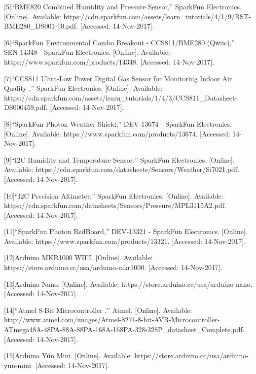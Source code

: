 \documentclass[IEEEtran,letterpaper,10pt,titlepage,fleqn,draftclsnofoot,onecolumn]{article}
\begin{document}
[5]“BME820 Combined Humidity and Pressure Sensor,” SparkFun Electronics. [Online]. Available: https://cdn.sparkfun.com/assets/learn\_tutorials/4/1/9/BST-BME280\_DS001-10.pdf. [Accessed: 14-Nov-2017].

\vspace{1mm}

[6]“SparkFun Environmental Combo Breakout - CCS811/BME280 (Qwiic),” SEN-14348 - SparkFun Electronics. [Online]. Available: https://www.sparkfun.com/products/14348. [Accessed: 14-Nov-2017].

\vspace{1mm}

[7]“CCS811 Ultra-Low Power Digital Gas Sensor for Monitoring Indoor Air Quality ,” SparkFun Electronics. [Online]. Available: https://cdn.sparkfun.com/assets/learn\_tutorials/1/4/3/CCS811\_Datasheet-DS000459.pdf. [Accessed: 14-Nov-2017].

\vspace{1mm}

[8]“SparkFun Photon Weather Shield,” DEV-13674 - SparkFun Electronics. [Online]. Available: https://www.sparkfun.com/products/13674. [Accessed: 14-Nov-2017].

\vspace{1mm}

[9]“I2C Humidity and Temperature Sensor,” SparkFun Electronics. [Online]. Available: https://cdn.sparkfun.com/datasheets/Sensors/Weather/Si7021.pdf. [Accessed: 14-Nov-2017].

\vspace{1mm}

[10]“I2C Precision Altimeter,” SparkFun Electronics. [Online]. Available: https://cdn.sparkfun.com/datasheets/Sensors/Pressure/MPL3115A2.pdf. [Accessed: 14-Nov-2017].

\vspace{1mm}

[11]“SparkFun Photon RedBoard,” DEV-13321 - SparkFun Electronics. [Online]. Available: https://www.sparkfun.com/products/13321. [Accessed: 14-Nov-2017].

\vspace{1mm}

[12]Arduino MKR1000 WIFI. [Online]. Available: https://store.arduino.cc/usa/arduino-mkr1000. [Accessed: 14-Nov-2017].

\vspace{1mm}

[13]Arduino Nano. [Online]. Available: https://store.arduino.cc/usa/arduino-nano. [Accessed: 14-Nov-2017].

\vspace{1mm}

[14]“Atmel 8-Bit Microcontroller ,” Atmel. [Online]. Available: http://www.atmel.com/images/Atmel-8271-8-bit-AVR-Microcontroller-ATmega48A-48PA-88A-88PA-168A-168PA-328-328P\_datasheet\_Complete.pdf. [Accessed: 14-Nov-2017].

\vspace{1mm}

[15]Arduino Yún Mini. [Online]. Available: https://store.arduino.cc/usa/arduino-yun-mini. [Accessed: 14-Nov-2017].
\end{document}

